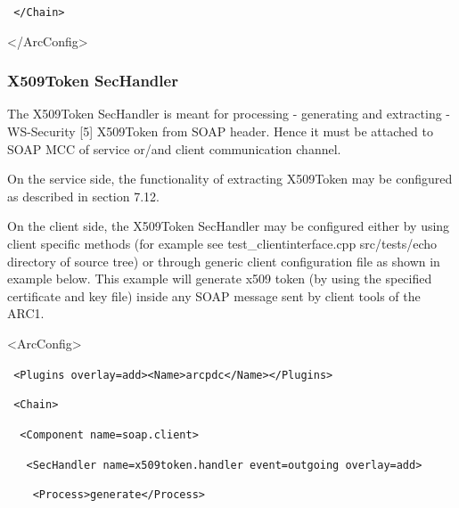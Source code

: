 \documentclass{article}
\begin{document}
{\upshape\color{black}
\texttt{\ {\textless}/Chain{\textgreater}}}

{\ttfamily\color{black}
{\textless}/ArcConfig{\textgreater}}

\subsubsection[X509Token SecHandler]{X509Token SecHandler}
{\color{black}
The X509Token SecHandler is meant for processing - generating and
extracting - WS-Security [5] X509Token from SOAP header. Hence it must
be attached to SOAP MCC of service or/and client communication channel.
}

{\color{black}
On the service side, the functionality of extracting X509Token may be
configured as described in section 7.12. }

{\color{black}
On the client side, the X509Token SecHandler may be configured either by
using client specific methods (for example see
test\_clientinterface.cpp src/tests/echo directory of source tree) or
through generic client configuration file as shown in example below.
This example will generate x509 token (by using the specified
certificate and key file) inside any SOAP message sent by client tools
of the ARC1.}

{\ttfamily\color{black}
{\textless}ArcConfig{\textgreater}}

{\upshape\color{black}
\texttt{\ {\textless}Plugins
overlay={\textquotedbl}add{\textquotedbl}{\textgreater}{\textless}Name{\textgreater}arcpdc{\textless}/Name{\textgreater}{\textless}/Plugins{\textgreater}}}

{\upshape\color{black}
\texttt{\ {\textless}Chain{\textgreater}}}

{\upshape\color{black}
\texttt{\ \ {\textless}Component
name={\textquotedbl}soap.client{\textquotedbl}{\textgreater}}}

{\upshape\color{black}
\texttt{\ \ \ {\textless}SecHandler
name={\textquotedbl}x509token.handler{\textquotedbl}
event={\textquotedbl}outgoing{\textquotedbl}
overlay={\textquotedbl}add{\textquotedbl}{\textgreater}}}

{\upshape\color{black}
\texttt{\ \ \ \ {\textless}Process{\textgreater}generate{\textless}/Process{\textgreater}}}
\end{document}
